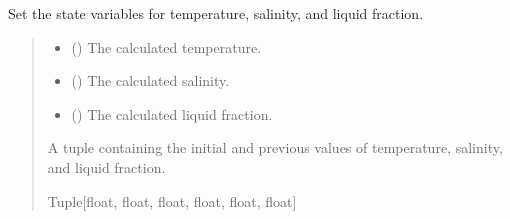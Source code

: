 \documentclass[a4paper,11pt,english,openany]{sphinxmanual}
\begin{document}
\begin{fulllineitems}
\label{\detokenize{api/spyice.statevariables:spyice.statevariables.set_statevariables}}
\pysigstartsignatures
{}
\pysigstopsignatures
\sphinxAtStartPar
Set the state variables for temperature, salinity, and liquid fraction.
\begin{quote}\begin{description}
\begin{itemize}
\item {} 
\sphinxAtStartPar
{} () \textendash{} The calculated temperature.

\item {} 
\sphinxAtStartPar
{} () \textendash{} The calculated salinity.

\item {} 
\sphinxAtStartPar
{} () \textendash{} The calculated liquid fraction.

\end{itemize}

\sphinxAtStartPar
A tuple containing the initial and previous values of temperature, salinity, and liquid fraction.

\sphinxAtStartPar
Tuple{[}float, float, float, float, float, float{]}

\end{description}\end{quote}

\end{fulllineitems}


\sphinxstepscope
{}\label{\detokenize{api/spyice.update_physical_values:module-spyice.update_physical_values}}
\end{document}
